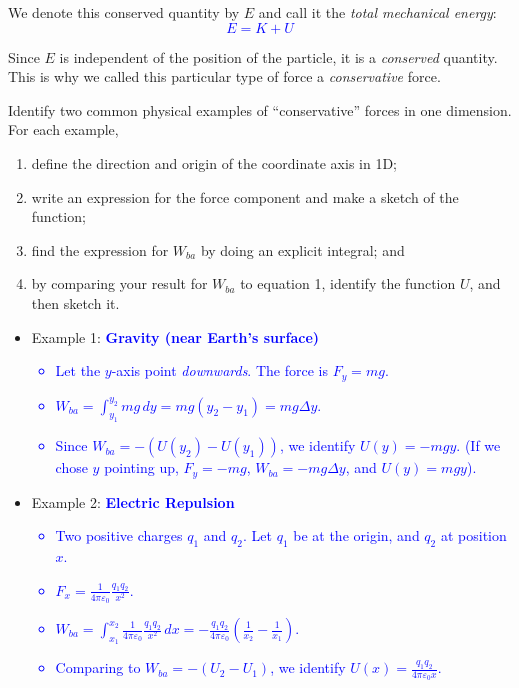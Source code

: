 \documentclass[11pt, letterpaper, openany]{book}
\newenvironment{exercise}[1][Exercise]{%
  \tcolorbox[blanker, breakable, left=1em,
    before skip=1em, after skip=1em,
    borderline west={3pt}{0pt}{PhysNavy},
    colback=PhysCream,
    before upper={\textcolor{PhysNavy}{\sffamily\bfseries #1:}\space}
  ]%
}{%
  \endtcolorbox%
}
\begin{document}
We denote this conserved quantity by $E$ and call it the \textit{total mechanical energy}:
\textcolor{blue}{\[ E = K + U \]}

Since $E$ is independent of the position of the particle, it is a \textit{conserved} quantity. This is why we called this particular type of force a \textit{conservative} force.

\begin{exercise}[Exercise 2]
Identify two common physical examples of ``conservative'' forces in one dimension. For each example,
\begin{enumerate}[label=(\alph*)]
    \item define the direction and origin of the coordinate axis in 1D;
    \item write an expression for the force component and make a sketch of the function;
    \item find the expression for $W_{ba}$ by doing an explicit integral; and
    \item by comparing your result for $W_{ba}$ to equation 1, identify the function $U$, and then sketch it.
\end{enumerate}

\begin{itemize}
    \item Example 1: \textcolor{blue}{\textbf{Gravity (near Earth's surface)}}
    \textcolor{blue}{
    \begin{itemize}
        \item Let the $y$-axis point \textit{downwards}. The force is $F_y = mg$.
        \item $W_{ba} = \int_{y_1}^{y_2} mg\,dy = mg(y_2 - y_1) = mg\Delta y$.
        \item Since $W_{ba} = -(U(y_2) - U(y_1))$, we identify $U(y) = -mgy$. (If we chose $y$ pointing up, $F_y = -mg$, $W_{ba} = -mg\Delta y$, and $U(y) = mgy$).
    \end{itemize}
    }
    
    \item Example 2: \textcolor{blue}{\textbf{Electric Repulsion}}
    \textcolor{blue}{
    \begin{itemize}
        \item Two positive charges $q_1$ and $q_2$. Let $q_1$ be at the origin, and $q_2$ at position $x$.
        \item $F_x = \frac{1}{4\pi\varepsilon_0}\frac{q_1 q_2}{x^2}$.
        \item $W_{ba} = \int_{x_1}^{x_2} \frac{1}{4\pi\varepsilon_0}\frac{q_1 q_2}{x^2}\,dx = -\frac{q_1 q_2}{4\pi\varepsilon_0}\left( \frac{1}{x_2} - \frac{1}{x_1} \right)$.
        \item Comparing to $W_{ba} = -(U_2 - U_1)$, we identify $U(x) = \frac{q_1 q_2}{4\pi\varepsilon_0 x}$.
    \end{itemize}
    }
\end{itemize}
\end{exercise}
\end{document}
